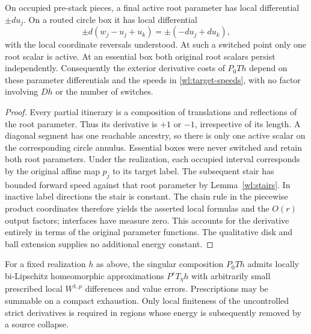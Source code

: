 \begin{proposition}\label{wl:parameter-cost}
On occupied pre-stack pieces, a final active root parameter has
local differential $\pm du_j$.  On a routed circle box it has local
differential
\begin{equation}\label{wl:diagonal-gradient}
 \pm d(w_j-u_j+u_k)=\pm(-du_j+du_k),
\end{equation}
with the local coordinate reversals understood.  At such a switched
point only one root scalar is active.  At an essential box both
original root scalars persist independently.  Consequently the
exterior derivative costs of $P_0Th$ depend on these parameter
differentials and the speeds in \eqref{wl:target-speeds}, with no
factor involving $Dh$ or the number of switches.
\end{proposition}

\begin{proof}
Every partial itinerary is a composition of translations and
reflections of the root parameter.  Thus its derivative is $+1$
or $-1$, irrespective of its length.  A diagonal segment has one
reachable ancestry, so there is only one active scalar on the
corresponding circle annulus.  Essential boxes were never switched
and retain both root parameters.  Under the realization, each
occupied interval corresponds by the original affine map $p_j$ to
its target label.  The subsequent stair has bounded forward speed
against that root parameter by Lemma~\ref{wl:stairs}.  In inactive
label directions the stair is constant.  The chain rule in the
piecewise product coordinates therefore yields the asserted local
formulas and the $O(r)$ output factors; interfaces have measure
zero.  This accounts for the derivative entirely in terms of the
original parameter functions.  The qualitative disk and ball
extension supplies no additional energy constant.
\end{proof}

\begin{proposition}\label{wl:strict}
For a fixed realization $h$ as above, the singular composition $P_0Th$
admits locally bi-Lipschitz homeomorphic approximations
$P^{\varepsilon}T_\eta h$ with arbitrarily small prescribed local
$W^{1,p}$ differences and value errors.  Prescriptions may be
summable on a compact exhaustion.  Only local finiteness of the
uncontrolled strict derivatives is required in regions whose energy
is subsequently removed by a source collapse.
\end{proposition}

